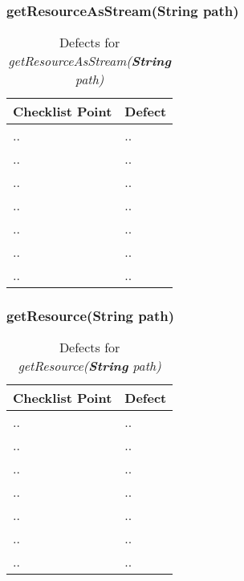 \subsubsection{getResourceAsStream(String path)}
\begin{table}[htbp]
\begin{center}
\begin{tabular}[t]{p{}p{}}

\hline
\textbf{Checklist Point} & \textbf{Defect} \\
\hline
.. & .. \\
\hline
.. & .. \\
\hline
.. & .. \\
\hline
.. & .. \\
\hline
.. & .. \\
\hline
.. & .. \\
\hline
.. & .. \\
\hline

\end{tabular}
\end{center}
\caption{Defects for \textit{getResourceAsStream(\textbf{String} path)}}
\end{table}
\clearpage

\subsubsection{getResource(String path)}
\begin{table}[htbp]
\begin{center}
\begin{tabular}[t]{p{}p{}}

\hline
\textbf{Checklist Point} & \textbf{Defect} \\
\hline
.. & .. \\
\hline
.. & .. \\
\hline
.. & .. \\
\hline
.. & .. \\
\hline
.. & .. \\
\hline
.. & .. \\
\hline
.. & .. \\
\hline

\end{tabular}
\end{center}
\caption{Defects for \textit{getResource(\textbf{String} path)}}
\end{table}
\clearpage

